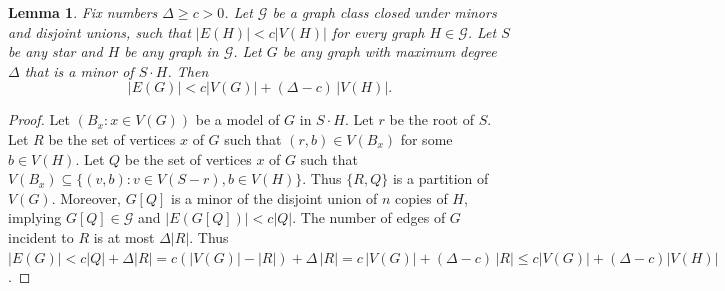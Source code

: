 \documentclass{patmorin}
\newcommand{\boxprod}{\mathbin{\Box}}
\renewcommand{\geq}{\geqslant}
\renewcommand{\leq}{\leqslant}
\DeclareMathOperator{\gm}{gm}
\newcommand{\GG}{\mathcal{G}}
\theoremstyle{plain}
\newtheorem{lem}[thm]{Lemma}
\newtheorem{cor}[thm]{Corollary}
\theoremstyle{definition}
\begin{document}


\begin{lem}
\label{StarGraph}
Fix numbers $\Delta\geq c>0$. Let $\GG$ be a  graph class closed under minors and disjoint unions, such that $|E(H)|<c|V(H)|$ for every graph $H\in\GG$. Let $S$ be any star and $H$ be any graph in $\GG$. Let $G$ be any graph with maximum degree $\Delta$ that is a minor of $S \cdot H$. Then 
$$|E(G)|< c|V(G)|+(\Delta-c)\,|V(H)|.$$ 
\end{lem}

\begin{proof}
Let
$(B_x:x\in V(G))$ be a model of $G$ in $S \cdot H$. Let $r$ be the root of $S$. Let $R$ be the set of vertices $x$ of $G$ such that $(r,b)\in V(B_x)$ for some $b\in V(H)$. 
Let $Q$ be the set of vertices $x$ of $G$ such that $V(B_x)\subseteq \{(v,b): v\in V(S-r),b\in V(H)\}$. 
Thus $\{R,Q\}$ is a partition of $V(G)$. Moreover, $G[Q]$ is a minor of the disjoint union of $n$ copies of $H$, implying $G[Q]\in\GG$ and $|E(G[Q])|<c|Q|$. The number of edges of $G$ incident to $R$ is at most $\Delta|R|$. 
Thus $|E(G)| < c|Q| + \Delta|R| 
= c(|V(G)|-|R|)+ \Delta\,|R|
= c\,|V(G)|+ (\Delta-c)\,|R|
\leq c|V(G)|+(\Delta-c)|V(H)|$.
\end{proof}


\end{document}
